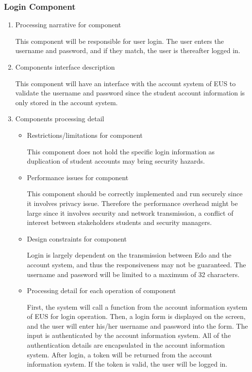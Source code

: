 \documentclass[paper=a4, fontsize=11pt]{scrartcl}
\numberwithin{equation}{section}		%
\numberwithin{figure}{section}			%
\numberwithin{table}{section}				%
\begin{document}
\subsubsection{Login Component}
\begin{enumerate}
	\item Processing narrative for component
	\par This component will be responsible for user login. The user enters the username and password, and if they match, the user is thereafter logged in.
	\item Components interface description
	\par This component will have an interface with the account system of EUS to validate the username and password since the student account information is only stored in the account system.
	\item Components processing detail
	\begin{itemize}
		\item Restrictions/limitations for component
		\par This component does not hold the specific login information as duplication of student accounts may bring security hazards.
		\item Performance issues for component 
		\par This component should be correctly implemented and run securely since it involves privacy issue. Therefore the performance overhead might be large since it involves security and network transmission, a conflict of interest between stakeholders students and security managers.
		\item Design constraints for component 
		\par Login is largely dependent on the transmission between Edo and the account system, and thus the responsiveness may not be guaranteed. The username and password will be limited to a maximum of 32 characters.
		\item Processing detail for each operation of component 
		\par First, the system will call a function from the account information system of EUS for login operation. Then, a login form is displayed on the screen, and the user will enter his/her username and password into the form. The input is authenticated by the account information system. All of the authentication details are encapsulated in the account information system. After login, a token will be returned from the account information system. If the token is valid, the user will be logged in.
	\end{itemize}
\end{enumerate}
\end{document}
